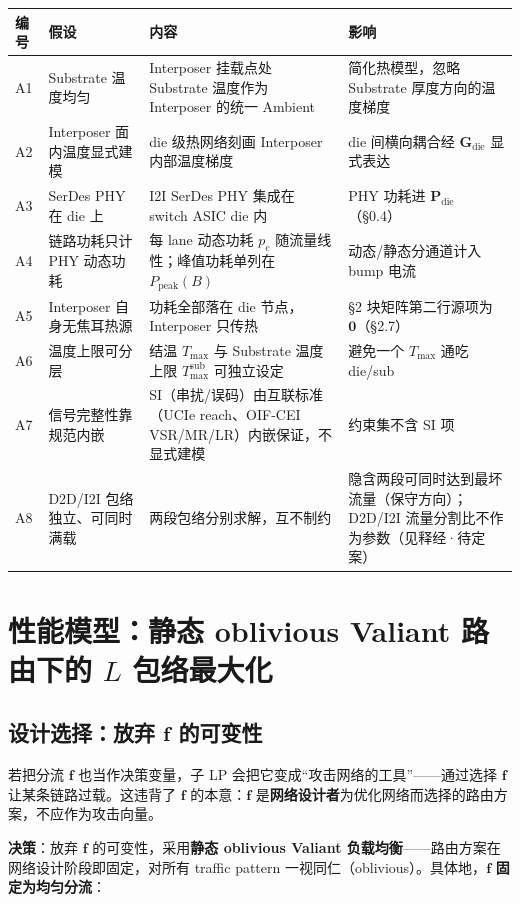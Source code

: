 \documentclass[11pt]{article}
\newcommand{\bv}{\mathbf}
\begin{document}
\begin{center}
\begin{tabularx}{\textwidth}{@{}lXXl@{}}
\toprule
编号 & 假设 & 内容 & 影响 \\
\midrule
A1 & Substrate 温度均匀 & Interposer 挂载点处 Substrate 温度作为 Interposer 的统一 Ambient & 简化热模型，忽略 Substrate 厚度方向的温度梯度 \\
A2 & Interposer 面内温度显式建模 & die 级热网络刻画 Interposer 内部温度梯度 & die 间横向耦合经 $\bv{G}_{\text{die}}$ 显式表达 \\
A3 & SerDes PHY 在 die 上 & I2I SerDes PHY 集成在 switch ASIC die 内 & PHY 功耗进 $\bv{P}_{\text{die}}$（§0.4） \\
A4 & 链路功耗只计 PHY 动态功耗 & 每 lane 动态功耗 $p_e$ 随流量线性；峰值功耗单列在 $P_{\text{peak}}(B)$ & 动态/静态分通道计入 bump 电流 \\
A5 & Interposer 自身无焦耳热源 & 功耗全部落在 die 节点，Interposer 只传热 & §2 块矩阵第二行源项为 $\bv{0}$（§2.7） \\
A6 & 温度上限可分层 & 结温 $T_{\max}$ 与 Substrate 温度上限 $T_{\max}^{\text{sub}}$ 可独立设定 & 避免一个 $T_{\max}$ 通吃 die/sub \\
A7 & 信号完整性靠规范内嵌 & SI（串扰/误码）由互联标准（UCIe reach、OIF-CEI VSR/MR/LR）内嵌保证，不显式建模 & 约束集不含 SI 项 \\
A8 & D2D/I2I 包络独立、可同时满载 & 两段包络分别求解，互不制约 & 隐含两段可同时达到最坏流量（保守方向）；D2D/I2I 流量分割比不作为参数（见释经·待定案） \\
\bottomrule
\end{tabularx}
\end{center}

\section{性能模型：静态 oblivious Valiant 路由下的 $L$ 包络最大化}

\subsection{设计选择：放弃 $\bv{f}$ 的可变性}

若把分流 $\bv{f}$ 也当作决策变量，子 LP 会把它变成“攻击网络的工具”——通过选择 $\bv{f}$ 让某条链路过载。这违背了 $\bv{f}$ 的本意：$\bv{f}$ 是\textbf{网络设计者}为优化网络而选择的路由方案，不应作为攻击向量。

\textbf{决策}：放弃 $\bv{f}$ 的可变性，采用\textbf{静态 oblivious Valiant 负载均衡}——路由方案在网络设计阶段即固定，对所有 traffic pattern 一视同仁（oblivious）。具体地，$\bv{f}$ \textbf{固定为均匀分流}：
\end{document}
